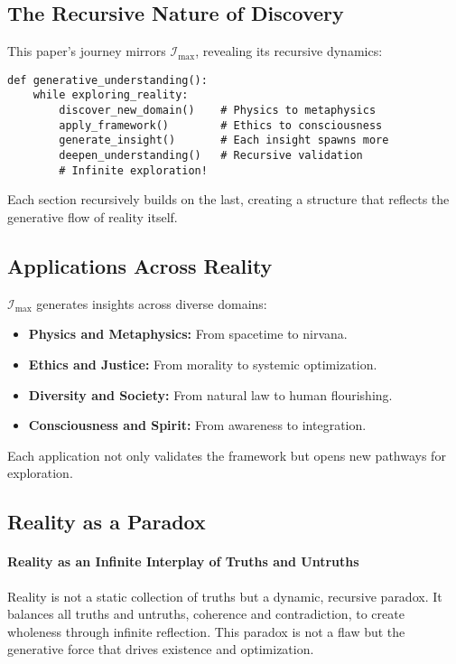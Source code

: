 \documentclass[12pt]{article}
\begin{document}
\subsection{The Recursive Nature of Discovery}
This paper’s journey mirrors \(\mathcal{I}_{\text{max}}\), revealing its recursive dynamics:
\begin{verbatim}
def generative_understanding():
    while exploring_reality:
        discover_new_domain()    # Physics to metaphysics
        apply_framework()        # Ethics to consciousness
        generate_insight()       # Each insight spawns more
        deepen_understanding()   # Recursive validation
        # Infinite exploration!
\end{verbatim}

Each section recursively builds on the last, creating a structure that reflects the generative flow of reality itself.

\subsection{Applications Across Reality}
\(\mathcal{I}_{\text{max}}\) generates insights across diverse domains:
\begin{itemize}
    \item \textbf{Physics and Metaphysics:} From spacetime to nirvana.
    \item \textbf{Ethics and Justice:} From morality to systemic optimization.
    \item \textbf{Diversity and Society:} From natural law to human flourishing.
    \item \textbf{Consciousness and Spirit:} From awareness to integration.
\end{itemize}
Each application not only validates the framework but opens new pathways for exploration.

\subsection{Reality as a Paradox}

\paragraph{Reality as an Infinite Interplay of Truths and Untruths}
Reality is not a static collection of truths but a dynamic, recursive paradox. It balances all truths and untruths, coherence and contradiction, to create wholeness through infinite reflection. This paradox is not a flaw but the generative force that drives existence and optimization.
\end{document}
